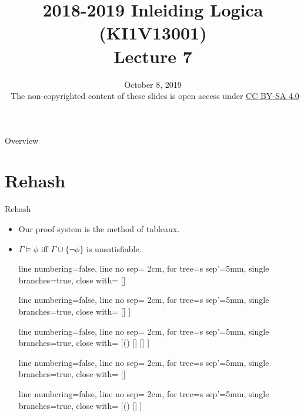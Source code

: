 \documentclass[../slides.tex]{subfiles}
\title{2018-2019 Inleiding Logica (KI1V13001) \\ Lecture 7}
\date{October 8, 2019\\[2ex] {\tiny \textcopyright~The non-copyrighted content of these slides is open access under \href{https://creativecommons.org/licenses/by-sa/4.0/}{CC BY-SA 4.0}}}
\begin{document}
\setcounter{framenumber}{200}
\begin{frame}
	\maketitle
\end{frame}

\begin{frame}{Overview}
\tableofcontents
\end{frame}

\section{Rehash}
\begin{frame}{Rehash}
	
\begin{itemize}

	\item Our proof system is the method of tableaux.

	\item $\Gamma\vDash\phi$ iff $\Gamma\cup\{\neg\phi\}$ is unsatisfiable.
	
	{\tiny\begin{center}
					
					\begin{prooftree}
					{
					line numbering=false,
					line no sep= 2cm,
					for tree={s sep'=5mm},
					single branches=true,
					close with=\xmark
					}
					[\neg\neg \phi [\phi ] ]
					\end{prooftree}
					\begin{prooftree}
					{
					line numbering=false,
					line no sep= 2cm,
					for tree={s sep'=5mm},
					single branches=true,
					close with=\xmark
					}
					[\phi\land\psi [\phi [\psi ] ] ]
					\end{prooftree}
					\begin{prooftree}
					{
					line numbering=false,
					line no sep= 2cm,
					for tree={s sep'=5mm},
					single branches=true,
					close with=\xmark
					}
					[\neg (\phi\land\psi) [\neg \phi ] [\neg \psi ] ]
					\end{prooftree}
					\begin{prooftree}
					{
					line numbering=false,
					line no sep= 2cm,
					for tree={s sep'=5mm},
					single branches=true,
					close with=\xmark
					}
					[\phi\lor\psi [\phi ] [\psi ] ]
					\end{prooftree}
					\begin{prooftree}
					{
					line numbering=false,
					line no sep= 2cm,
					for tree={s sep'=5mm},
					single branches=true,
					close with=\xmark
					}
					[\neg(\phi\lor\psi) [\neg\phi [\neg\psi ] ] ]
					\end{prooftree}


\end{center}}
\end{itemize}
\end{frame}
\end{document}
